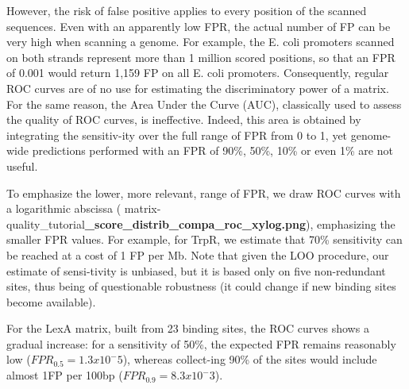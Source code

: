 However, the risk of false positive applies to every position of the
scanned sequences. Even with an apparently low FPR, the actual number
of FP can be very high when scanning a genome. For example, the
E. coli promoters scanned on both strands represent more than 1
million scored positions, so that an FPR of 0.001 would return 1,159
FP on all E. coli promoters. Consequently, regular ROC curves are of
no use for estimating the discriminatory power of a matrix. For the
same reason, the Area Under the Curve (AUC), classically used to
assess the quality of ROC curves, is ineffective. Indeed, this area is
obtained by integrating the sensitiv-ity over the full range of FPR
from 0 to 1, yet genome-wide predictions performed with an FPR of
90\%, 50\%, 10\% or even 1\% are not useful.

To emphasize the lower, more relevant, range of FPR, we draw ROC
curves with a logarithmic abscissa (
matrix-quality\_tutorial\textbf{\_score\_distrib\_compa\_roc\_xylog.png}),
emphasizing the smaller FPR values. For example, for TrpR, we estimate
that 70\% sensitivity can be reached at a cost of 1 FP per Mb. Note
that given the LOO procedure, our estimate of sensi-tivity is
unbiased, but it is based only on five non-redundant sites, thus being
of questionable robustness (it could change if new binding sites
become available).

For the LexA matrix, built from 23 binding sites, the ROC curves shows
a gradual increase: for a sensitivity of 50\%, the expected FPR
remains reasonably low (\(FPR_{0.5} =1.3x10^-5\)), whereas collect-ing 90\% of
the sites would include almost 1FP per 100bp (\(FPR_{0.9} =8.3x10^-3\)).

